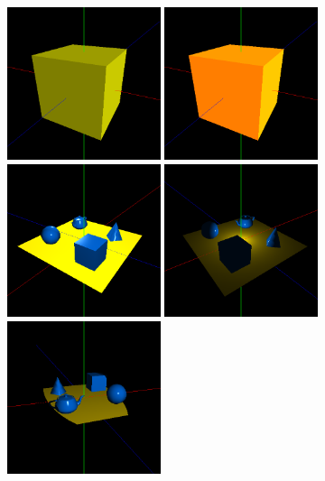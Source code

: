 \documentclass[12pt, a4paper]{article}
\begin{document}
\begin{figure}[H]
    \centering
    \includegraphics[width=0.4\textwidth]{res/phase4/results/Test1.png}
    \includegraphics[width=0.4\textwidth]{res/phase4/results/Test2.png}
    \includegraphics[width=0.4\textwidth]{res/phase4/results/Test3.png}
    \includegraphics[width=0.4\textwidth]{res/phase4/results/Test4.png}
    \includegraphics[width=0.4\textwidth]{res/phase4/results/Test5.png}

\end{figure}
\end{document}
